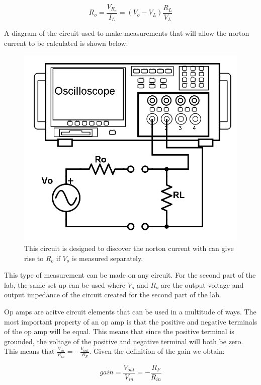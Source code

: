 \documentclass[twocolumn, amsmath]{revtex4}
\begin{document}
\begin{equation}
R_{o} =  \frac{V_{R_{o}}}{I_{L}} = (V_{o} - V_{L})\frac{R_{L}}{V_{L}}
\end{equation}

A diagram of the circuit used to make measurements that will allow the norton current to be calculated is shown below:

\begin{figure}[h]
    \includegraphics[scale=0.25]{output.png}  
    \caption{This circuit is designed to discover the norton current with can give rise to $R_{o}$ if $V_{o}$ is measured separately.}
\end{figure}

This type of measurement can be made on any circuit. For the second part of the lab, the same set up can be used where $V_{o}$ and $R_{o}$ are the output voltage and output impedance of the circuit created for the second part of the lab.

Op amps are acitve circuit elements that can be used in a multitude of ways. The most important property of an op amp is that the positive and negative terminals of the op amp will be equal. This means that since the positive terminal is grounded, the voltage of the positive and negative terminal will both be zero. This means that $\frac{V_{in}}{R_{in}} = -\frac{V_{out}}{R_{F}}$. Given the definition of the gain we obtain:

\begin{equation}
gain =  \frac{V_{out}}{V_{in}} = -\frac{R_{F}}{R_{in}}
\end{equation}
\end{document}
